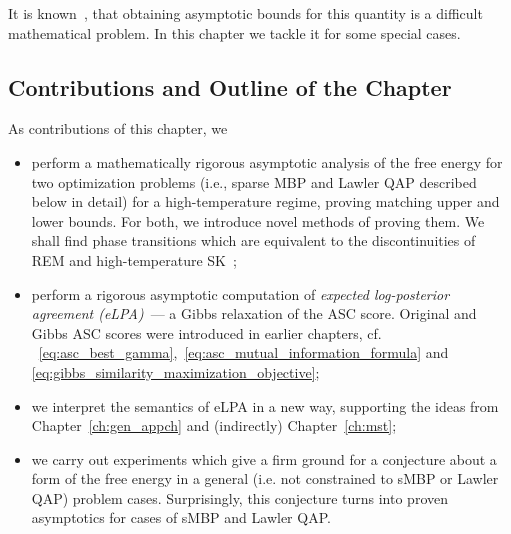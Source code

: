

It is known~\citep{Bovier2002FreeEnergyFluct,talagrand03}, that obtaining
asymptotic bounds for this quantity is a difficult mathematical problem. In
this chapter we tackle it for some special cases.

\subsection{Contributions and Outline of the Chapter}
\label{sec:free_energy_contribs}

As contributions of this chapter, we 
\begin{itemize}
  \item perform a mathematically rigorous asymptotic analysis of the free energy for 
  two optimization problems (i.e., sparse MBP and Lawler QAP described below in
  detail) for a high-temperature regime, proving matching upper and lower
  bounds. For both, we introduce novel methods of proving them. We shall find
  phase transitions which are equivalent to the discontinuities of REM and
  high-temperature SK~\citep{derrida81,Aizenman1987};
  \item perform a rigorous asymptotic computation of \textit{expected log-posterior
  agreement (eLPA)}~--- a Gibbs relaxation of the ASC score. Original and Gibbs
  ASC scores were introduced in earlier chapters, cf.
  ~\eqref{eq:asc_best_gamma},~\eqref{eq:asc_mutual_information_formula} and
  \eqref{eq:gibbs_similarity_maximization_objective};
  \item we interpret the semantics of eLPA in a new way, supporting the ideas from
  Chapter~\ref{ch:gen_appch} and (indirectly) Chapter~\ref{ch:mst};
  \item we carry out experiments which give a firm ground for a conjecture about
  a form of the free energy in a general (i.e. not constrained to sMBP or Lawler
  QAP) problem cases. Surprisingly, this conjecture turns into proven asymptotics
  for cases of sMBP and Lawler QAP.
\end{itemize}


